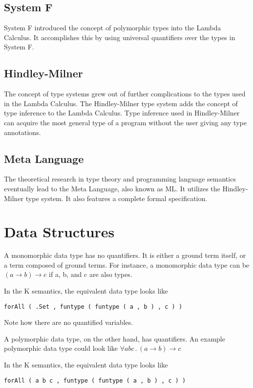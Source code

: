 \subsection{System F}
System F \cite{Reynolds2018} introduced the concept of polymorphic types into the Lambda Calculus. It accomplishes this by using universal quantifiers over the types in System F.

\subsection{Hindley-Milner}
The concept of type systems grew out of further complications to the types used in the Lambda Calculus.
The Hindley-Milner type system adds the concept of type inference to the Lambda Calculus. Type inference used in Hindley-Milner can acquire the most general type of a program without the user giving any type annotations.

\subsection{Meta Language}
The theoretical research in type theory and programming language semantics eventually lead to the Meta Language, also known as ML. It utilizes the Hindley-Milner type system. It also features a complete formal specification.

\section{Data Structures}

A monomorphic data type has no quantifiers. It is either a ground term itself, or a term composed of ground terms. For instance, a monomorphic data type can be $(a \rightarrow b) \rightarrow c$ if a, b, and c are also types.

In the K semantics, the equivalent data type looks like
\begin{lstlisting}
forAll ( .Set , funtype ( funtype ( a , b ) , c ) )
\end{lstlisting}

Note how there are no quantified variables.

A polymorphic data type, on the other hand, has quantifiers. An example polymorphic data type could look like $\forall a b c \, . \, (a \rightarrow b) \rightarrow c$

In the K semantics, the equivalent data type looks like
\begin{lstlisting}
forAll ( a b c , funtype ( funtype ( a , b ) , c ) )
\end{lstlisting}

